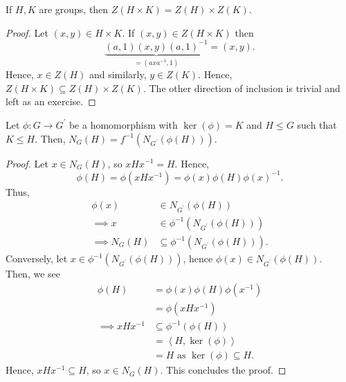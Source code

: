 \begin{lemma}
	If \(H, K\) are groups, then \(Z\left( H \times K \right) = Z\left( H \right)  \times Z\left( K \right) \).
\end{lemma}
\begin{proof}
	Let \(\left( x, y \right) \in H \times K\). If \(\left( x, y  \right) \in Z\left( H \times K \right) \) then \[
		\underbrace{\left( a, 1 \right) \left( x, y \right) \left( a, 1 \right) ^{-1}}_{= \left( axa^{-1}, 1 \right) } = \left( x,y \right)
	.\]
	Hence, \(x \in Z\left( H \right) \) and similarly, \(y \in Z\left( K \right) \). Hence, \(Z\left( H \times K \right) \subseteq Z\left( H \right) \times Z\left( K \right) \). The other direction of inclusion is trivial and left as an exercise.
\end{proof}
\begin{lemma}
	Let \(\phi: G \to G^{\prime}\) be a homomorphism with \(\ker \left( \phi \right) = K\) and \(H \le G\) such that \(K \le H\). Then, \(N_{G}\left( H \right) = f^{-1}\left( N_{G^{\prime}}\left( \phi\left( H \right)  \right)  \right) \).
\end{lemma}
\begin{proof}
Let \(x \in N_{G}\left( H \right) \), so \(xHx^{-1} = H\). Hence, \[\phi\left( H \right)  = \phi\left( xHx^{-1} \right) = \phi\left( x \right)  \phi\left( H \right)  \phi\left( x \right) ^{-1}.\]
Thus, \begin{align*}\phi\left( x \right) &\in N_{G^{\prime}}\left( \phi\left( H \right)  \right)\\
	\implies x &\in \phi^{-1}\left( N_{G^{\prime}}\left( \phi\left( H \right)  \right)  \right) \\
	\implies N_{G}\left( H \right) &\subseteq \phi^{-1}\left( N_{G^{\prime}}\left( \phi\left( H \right)  \right)  \right) .
\end{align*}
Conversely, let \(x \in \phi^{-1}\left( N_{G^{\prime}}\left( \phi\left( H \right)  \right)  \right) \), hence \(\phi\left( x \right) \in N_{G^{\prime}}\left( \phi(H) \right) \).\\
Then, we see \begin{align*}
\phi\left( H \right) &= \phi\left( x \right) \phi\left( H \right) \phi\left( x^{-1} \right)\\
		     &= \phi\left( xHx^{-1} \right)\\
		     \implies xHx^{-1} &\subseteq \phi^{-1}\left( \phi\left( H \right)   \right)\\
				       &= \left< H, \ker \left( \phi   \right) \right>\\
	     &=  H \text{ as \(\ker \left( \phi \right) \subseteq H\)}.\end{align*}
	     Hence, \(xHx^{-1} \subseteq H\), so \(x \in N_{G}\left( H \right) \). This concludes the proof.
\end{proof}

